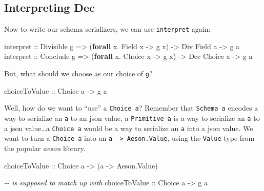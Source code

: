 \documentclass[]{article}
\newenvironment{Shaded}{}{}
\newcommand{\CommentTok}[1]{\textcolor[rgb]{0.38,0.63,0.69}{\textit{#1}}}
\newcommand{\DataTypeTok}[1]{\textcolor[rgb]{0.56,0.13,0.00}{#1}}
\newcommand{\KeywordTok}[1]{\textcolor[rgb]{0.00,0.44,0.13}{\textbf{#1}}}
\newcommand{\NormalTok}[1]{#1}
\newcommand{\OperatorTok}[1]{\textcolor[rgb]{0.40,0.40,0.40}{#1}}
\newcommand{\OtherTok}[1]{\textcolor[rgb]{0.00,0.44,0.13}{#1}}
\begin{document}
\hypertarget{interpreting-dec}{%
\subsection{Interpreting Dec}\label{interpreting-dec}}

Now to write our schema serializers, we can use \texttt{interpret} again:

\begin{Shaded}
\begin{Highlighting}[]
\OtherTok{interpret ::} \DataTypeTok{Divisible}\NormalTok{ g }\OtherTok{=>}\NormalTok{ (}\KeywordTok{forall}\NormalTok{ x}\OperatorTok{.} \DataTypeTok{Field}\NormalTok{  x }\OtherTok{{-}>}\NormalTok{ g x) }\OtherTok{{-}>} \DataTypeTok{Div} \DataTypeTok{Field}\NormalTok{  a }\OtherTok{{-}>}\NormalTok{ g a}
\OtherTok{interpret ::} \DataTypeTok{Conclude}\NormalTok{ g  }\OtherTok{=>}\NormalTok{ (}\KeywordTok{forall}\NormalTok{ x}\OperatorTok{.} \DataTypeTok{Choice}\NormalTok{ x }\OtherTok{{-}>}\NormalTok{ g x) }\OtherTok{{-}>} \DataTypeTok{Dec} \DataTypeTok{Choice}\NormalTok{ a }\OtherTok{{-}>}\NormalTok{ g a}
\end{Highlighting}
\end{Shaded}

But, what should we choose as our choice of \texttt{g}?

\begin{Shaded}
\begin{Highlighting}[]
\OtherTok{choiceToValue ::} \DataTypeTok{Choice}\NormalTok{ a }\OtherTok{{-}>}\NormalTok{ g a}
\end{Highlighting}
\end{Shaded}

Well, how do we want to ``use'' a \texttt{Choice\ a}? Remember that
\texttt{Schema\ a} encodes a way to serialize an \texttt{a} to an json value, a
\texttt{Primitive\ a} is a way to serialize an \texttt{a} to a json
value\ldots a \texttt{Choice\ a} would be a way to serialize an \texttt{a} into
a json value. We want to turn a \texttt{Choice\ a} into an
\texttt{a\ -\textgreater{}\ Aeson.Value}, using the \texttt{Value} type from the
popular \emph{aeson} library.

\begin{Shaded}
\begin{Highlighting}[]
\OtherTok{choiceToValue ::} \DataTypeTok{Choice}\NormalTok{ a }\OtherTok{{-}>}\NormalTok{ (a }\OtherTok{{-}>} \DataTypeTok{Aeson.Value}\NormalTok{)}

\CommentTok{{-}{-} is supposed to match up with}
\OtherTok{choiceToValue ::} \DataTypeTok{Choice}\NormalTok{ a }\OtherTok{{-}>}\NormalTok{ g a}
\end{Highlighting}
\end{Shaded}
\end{document}
